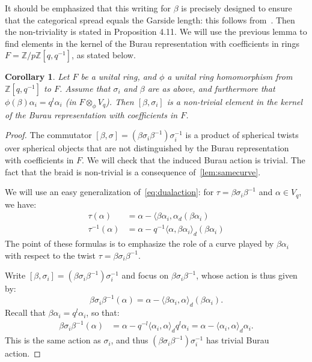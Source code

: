 \documentclass[a4paper]{amsart}
\newcommand{\Z}{\mathbb{Z}}
\newcommand{\0}{\mathbf{0}}
\theoremstyle{theorem}
\newtheorem{corollary}[theorem]{Corollary}
\begin{document}
It should be emphasized that this writing for $\beta$ is precisely designed to ensure that the categorical spread equals the Garside length: this follows from~\cite[Prop 4.6 and Cor 4.10]{LQ}. Then the non-triviality is stated in Proposition 4.11. We will use the previous lemma to find elements in the kernel of the Burau representation with coefficients in rings $F=\Z/p\Z[q,q^{-1}]$, as stated below.

\begin{corollary} \label{cor:Bigelow3}
Let $F$ be a unital ring, and $\phi$ a unital ring homomorphism from $\Z[q,q^{-1}]$ to $F$. Assume that $\sigma_i$ and $\beta$ are as above, and furthermore that $\phi(\beta)\alpha_i=q^l\alpha_i$ (in $F\otimes_{\phi}V_q$). Then $[\beta,\sigma_i]$ is a non-trivial element in the kernel of the Burau representation with coefficients in $F$.
\end{corollary}


\begin{proof}
  The commutator $[\beta,\sigma]=(\beta\sigma_i\beta^{-1})\sigma_{i}^{-1}$ is a product of spherical twists over spherical objects that are not distinguished by the Burau representation with coefficients in $F$. We will check that the induced Burau action is trivial. The fact that the braid is non-trivial is a consequence of~\cref{lem:samecurve}.

  We will use an easy generalization of~\cref{eq:dualaction}: for $\tau=\beta\sigma_i\beta^{-1}$ and $\alpha\in V_q$, we have:
  \begin{align*}
    \tau(\alpha)&=\alpha-\langle\beta \alpha_i,\alpha_d(\beta\alpha_i) \\
    \tau^{-1}(\alpha)&=\alpha-q^{-1}\langle\alpha,\beta\alpha_i\rangle_d (\beta\alpha_i)
  \end{align*}
  The point of these formulas is to emphasize the role of a curve played by $\beta\alpha_i$ with respect to the twist $\tau=\beta\sigma_i\beta^{-1}$.
  
Write $[\beta,\sigma_i]=(\beta\sigma_i\beta^{-1})\sigma_i^{-1}$ and focus on $\beta\sigma_i\beta^{-1}$, whose action is thus given by:
  \[
  \beta\sigma_i\beta^{-1}(\alpha)=\alpha-\langle\beta \alpha_i,\alpha\rangle_d(\beta\alpha_i).
  \]
  Recall that $\beta\alpha_i=q^{l}\alpha_i$, so that:
  \begin{align*}
      \beta\sigma_i\beta^{-1}(\alpha)&=\alpha-q^{-l}\langle\alpha_i,\alpha\rangle_dq^l\alpha_i=\alpha-\langle \alpha_i,\alpha\rangle_d\alpha_i.
  \end{align*}
  This is the same action as $\sigma_i$, and thus $(\beta\sigma_i\beta^{-1})\sigma_i^{-1}$ has trivial Burau action.
\end{proof}
\end{document}
